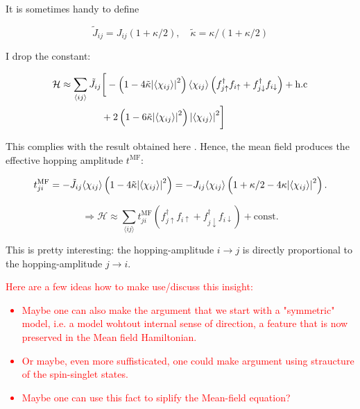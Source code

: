 \documentclass{article}
\begin{document}
It is sometimes handy to define 

\begin{equation}
	\tilde{J}_{ij} = J_{ij}\left( 1+ \kappa/2\right), \quad \tilde{\kappa} = \kappa/(1+\kappa/2)
\end{equation}

I drop the constant:

\begin{align}
	\begin{split}
		\mathcal{H} \approx \sum_{\langle ij \rangle} \tilde{J}_{ij}&\bigg[ -\left(1 - 4 \tilde{\kappa} \abs{\langle \chi_{ij}\rangle}^2\right)\langle \chi_{ij} \rangle \left(f_{j\uparrow}^\dagger f_{i\uparrow} + f_{j\downarrow}^\dagger f_{i\downarrow}\right) + \text{h.c} \\
		&+ 2\left( 1 - 6\tilde{\kappa} \abs{\langle \chi_{ij} \rangle}^2 \right) \abs{\langle \chi_{ij} \rangle}^2 \bigg] 
	\end{split}
\end{align}

This complies with the result obtained here \cite{Drechsler2025}. Hence, the mean field produces the effective hopping amplitude $t^{\text{MF}}$:

\begin{equation}
	t^{\text{MF}}_{ji} = - \tilde{J}_{ij}\langle \chi_{ij} \rangle \left(1 - 4\tilde{\kappa} \abs{ \langle \chi_{ij} \rangle}^2\right) =  -J_{ij}\langle \chi_{ij} \rangle \left(1 + \kappa/2  - 4 \kappa \abs{\langle \chi_{ij} \rangle}^2 \right).
\end{equation}

\begin{equation}
	\Rightarrow \mathcal{H} \approx \sum_{\langle ij \rangle} t^{\text{MF}}_{ji}\left( f_{j\uparrow}^\dagger f_{i\uparrow} + f_{j\downarrow}^\dagger f_{i\downarrow} \right) + \text{const.}
\end{equation}

This is pretty interesting: the hopping-amplitude $i \rightarrow j$ is directly proportional to the hopping-amplitude $j \rightarrow i$. \textcolor{red}{Here are a few ideas how to make use/discuss this insight:
\begin{itemize}
	\item Maybe one can also make the argument that we start with a "symmetric" model, i.e. a model wohtout internal sense of direction, a feature that is now preserved in the Mean field Hamiltonian. 
	\item Or maybe, even more suffisticated, one could make argument using straucture of the spin-singlet states.
	\item Maybe one can use this fact to siplify the Mean-field equation?
\end{itemize}}
\end{document}
